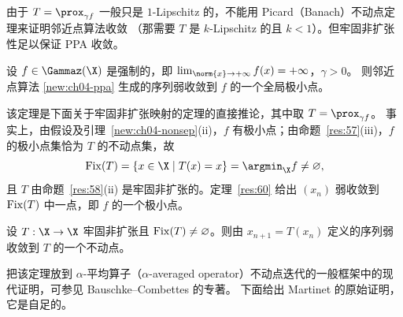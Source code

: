 由于 $T=\prox_{\gamma f}$ 一般只是 $1$-Lipschitz 的，不能用 Picard（Banach）不动点定理来证明邻近点算法收敛
（那需要 $T$ 是 $k$-Lipschitz 的且 $k<1$）。但牢固非扩张性足以保证 PPA 收敛。

\begin{theorem}[Martinet]
\label{res:59}
设 $f\in\Gammaz(\X)$ 是强制的，即 $\lim_{\norm{x}\to+\infty}f(x)=+\infty$，$\gamma>0$。
则邻近点算法 \eqref{new:ch04-ppa} 生成的序列弱收敛到 $f$ 的一个全局极小点。
\end{theorem}

该定理是下面关于牢固非扩张映射的定理的直接推论，其中取 $T=\prox_{\gamma f}$。
事实上，由假设及引理~\ref{new:ch04-nonsep}(ii)，$f$ 有极小点；由命题~\ref{res:57}(iii)，$f$ 的极小点集恰为 $T$ 的不动点集，故
\[
  \Fix(T)=\{x\in\X\mid T(x)=x\}=\argmin_\X f\neq\varnothing ,
\]
且 $T$ 由命题~\ref{res:58}(ii) 是牢固非扩张的。定理~\ref{res:60} 给出 $(x_n)$ 弱收敛到 $\operatorname{Fix}(T)$ 中一点，即 $f$ 的一个极小点。

\begin{theorem}[Martinet]
\label{res:60}
设 $T:\X\to\X$ 牢固非扩张且 $\operatorname{Fix}(T)\neq\varnothing$。则由 $x_{n+1}=T(x_n)$ 定义的序列弱收敛到 $T$ 的一个不动点。
\end{theorem}

把该定理放到 $\alpha$-平均算子（$\alpha$-averaged operator）不动点迭代的一般框架中的现代证明，可参见 Bauschke--Combettes 的专著。
下面给出 Martinet 的原始证明，它是自足的。

